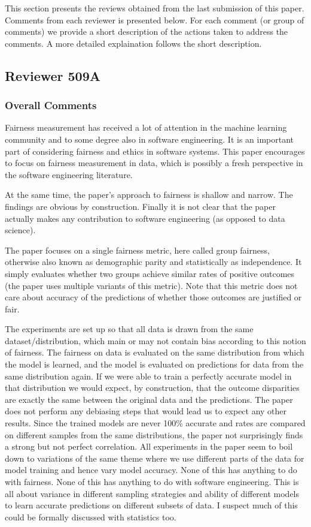 \documentclass[conference,review,anonymous]{IEEEtran}
\begin{document}

This section presents the reviews obtained from the last submission of
this paper. Comments from each reviewer is presented below. For each
comment (or group of comments) we provide a short description of the
actions taken to address the comments. A more detailed explaination
follows the short description.

\subsection{Reviewer 509A}
\subsubsection{Overall Comments}

Fairness measurement has received a lot of attention in the machine
learning community and to some degree also in software engineering. It
is an important part of considering fairness and ethics in software
systems. This paper encourages to focus on fairness measurement in
data, which is possibly a fresh perspective in the software
engineering literature.

At the same time, the paper’s approach to fairness is shallow and
narrow. The findings are obvious by construction. Finally it is not
clear that the paper actually makes any contribution to software
engineering (as opposed to data science).

The paper focuses on a single fairness metric, here called group
fairness, otherwise also known as demographic parity and statistically
as independence. It simply evaluates whether two groups achieve
similar rates of positive outcomes (the paper uses multiple variants
of this metric). Note that this metric does not care about accuracy of
the predictions of whether those outcomes are justified or fair.

The experiments are set up so that all data is drawn from the same
dataset/distribution, which main or may not contain bias according to
this notion of fairness. The fairness on data is evaluated on the same
distribution from which the model is learned, and the model is
evaluated on predictions for data from the same distribution again. If
we were able to train a perfectly accurate model in that distribution
we would expect, by construction, that the outcome disparities are
exactly the same between the original data and the predictions. The
paper does not perform any debiasing steps that would lead us to
expect any other results. Since the trained models are never 100\%
accurate and rates are compared on different samples from the same
distributions, the paper not surprisingly finds a strong but not
perfect correlation. All experiments in the paper seem to boil down to
variations of the same theme where we use different parts of the data
for model training and hence vary model accuracy. None of this has
anything to do with fairness. None of this has anything to do with
software engineering. This is all about variance in different sampling
strategies and ability of different models to learn accurate
predictions on different subsets of data. I suspect much of this could
be formally discussed with statistics too.
\end{document}
